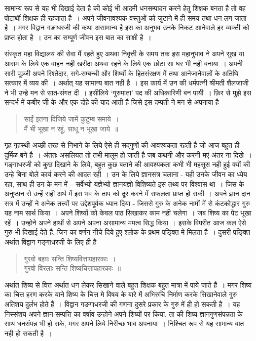 {सामान्य रूप से यह भी दिखाई देता है की कोई भी आदमी धनसम्पादन करने हेतु शिक्षक बनता है तो वह पोटार्थी शिक्षक ही रहजाता है~। अपने जीवनावश्यक वस्तुओं को जुटाने में ही समय तथा धन लग जाता है~। मगर विद्वान गङाधरजी की कथा असामान्य है इस का अनुभव उनके निकट आनेवाले हर व्यक्ती को प्राप्त होता है~। उन का सम्पूर्ण जीवन इस बात का साक्षी है~।

संस्कृत महा विद्यालय की सेवा मैं रहते हुए अथवा निवृत्ती के समय तक इस महानुभाव ने अपने सुख या आराम के लिये एक वाहन नही खरीदा अथवा रहने के लिये एक छोटा सा घर भी नही बनाया~। अपनी सारी पूञ्जी अपने रिश्तेदार, सगे-सम्बन्धी और शिष्यों के हितसंरक्षण में तथा आनेजानेवालों के अतिथि सत्कार में व्यय की~। अर्थात् यह सामान्य बात नही है~। इस कार्य में उन की धर्मपत्नी श्रीमती शैलजाजी ने भी उन्हे मन से सात-संगत दी~। इसीलिये ‘गुरुमाता’ पद की अधिकारिणी बन पायी~। फ़िर से मुझे इस सन्दर्भ में कबीर जी के और एक दोहे की याद आती है जिसे इस दम्पती ने मन से अपनाया है 
\begin{verse}
साईं इतना दिजिये जामें कुटुम्ब समाये~।\\
मैं भी भूखा न रहूं, साधू न भूखा जाये~॥
\end{verse}
गृह-गृहस्थी अच्छी तरह से निभाने के लिये ऐसे ही सद्गुणों की आवश्यकता रहती है जो आज बहुत ही दुर्मिळ बने है~। अंततः असलियत तो तभी मालूम हो जाती है जब कथनी और करनी मएं अंतर ना दिखे~। गङ्गाधरजी को कुछ दिखाने के लिये, बहुत कुछ बताने की आवश्यकता कभी भी महसूस नही हुई क्यों की उन्हे बिना बोले कार्य करने की आदत रही~। उन के लिये ज्ञानसत्र चलाना - यही उनके जीवन का ध्येय रहा, साथ ही उन के मन में -- सर्वेभ्यो यज्ञेभ्यो ज्ञानयज्ञो विशिष्यते इस तथ्य पर विश्वास था~। जिस के अनुष्ठान से उन्हें सही अर्थ में इस भव के ताप को दूर करने में सफलता प्राप्त हो सकी~। अपने ज्ञान दान सत्र में उन्हों ने अनेक तत्त्वों पर उद्देशपूर्वक ध्यान दिया - जिससे गुरु के अनेक नामों में से कंटकोद्धार गुरु यह नाम सार्थ किया~। अपने शिष्यों को केवल पाठ सिखाकर काम नही चलेगा~। जब शिष्य का पेट भूखा रहें~। उन्होने अपने हाथों से अपने अपना असामान्य ममत्व सिद्ध किया~। इसके विपरीत आज कल ऐसे गुरु भी दिखाई देते है, जिन का वर्णन नीचे दिये हुए श्लोक के प्रथम पङ्क्ति मे मिलता है~। दुसरी पङ्क्ति अर्थात विद्वान गङ्गाधरजी के लिए ही है  
\begin{verse}
गुरवो बहवः सन्ति शिष्यवित्तापहारकाः~।\\
गुरवो विरलाः सन्ति शिष्यचित्तापहारकाः~॥
\end{verse}
अर्थात शिष्य से वित्त अर्थात धन लेकर सिखाने वाले बहुत शिक्षक बहुत मात्रा में पाये जाते हैं~। मगर शिष्य का चित्त हरण  करके याने शिष्य के चित्त मे विषय के बारे में अभिरुचि निर्माण करके सिखानेवाले गुरु अतिशय दुर्लभ  होते हैं~। विद्वान गङगाधरजी की गणना दुसरे प्रकार के गुरु में ही हो सकती है~। यह निस्संशय अपने ज्ञान सम्पत्ति का वर्षाव उन्होने अपने शिष्यों पर किया, ता की शिष्य ज्ञानगुणसंपन्नता के साथ धनसंपन्न भी हो सके, मगर अपने लिये निरीच्छ भाव अपनाया~। निश्चित रूप से यह सामान्य बात नही हो सकती है~।

}

